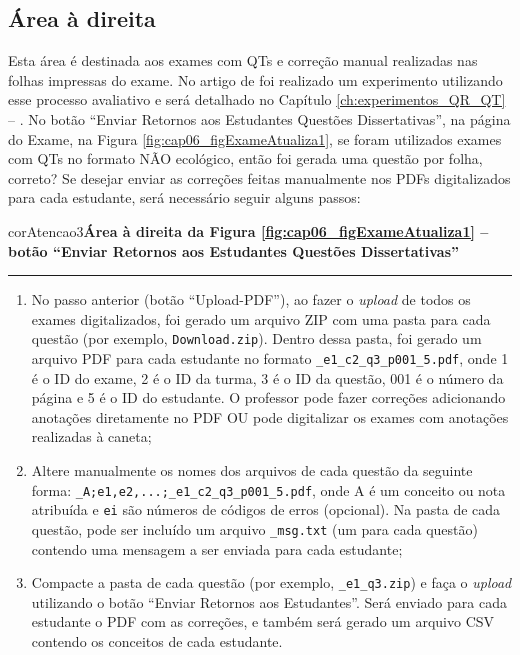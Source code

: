 \subsection{Área à direita}\label{sec:areaDireita}

Esta área é destinada aos exames com QTs e correção manual realizadas nas folhas impressas do exame. No artigo de  foi realizado um experimento utilizando esse processo avaliativo e será detalhado no Capítulo \ref{ch:experimentos_QR_QT} -- . No botão ``Enviar Retornos aos Estudantes Questões Dissertativas'', na página do Exame, na Figura \ref{fig:cap06_figExameAtualiza1}, se foram utilizados exames com QTs no formato NÃO ecológico, então foi gerada uma questão por folha, correto? Se desejar enviar as correções feitas manualmente nos PDFs digitalizados para cada estudante, será necessário seguir alguns passos:

\begin{mybox}{corAtencao3}{\textbf{Área à direita da Figura \ref{fig:cap06_figExameAtualiza1} -- botão ``Enviar Retornos aos Estudantes Questões Dissertativas''}}\\\vspace{-3mm}\hrule\vspace{1mm}
\begin{enumerate}[itemsep=-1mm]
    \item No passo anterior (botão ``Upload-PDF''), ao fazer o \textit{upload} de todos os exames digitalizados, foi gerado um arquivo ZIP com uma pasta para cada questão (por exemplo, \verb|Download.zip|). Dentro dessa pasta, foi gerado um arquivo PDF para cada estudante no formato \verb|_e1_c2_q3_p001_5.pdf|, onde 1 é o ID do exame, 2 é o ID da turma, 3 é o ID da questão, 001 é o número da página e 5 é o ID do estudante. O professor pode fazer correções adicionando anotações diretamente no PDF OU pode digitalizar os exames com anotações realizadas à caneta;
    \item Altere manualmente os nomes dos arquivos de cada questão da seguinte forma: \verb|_A;e1,e2,...;_e1_c2_q3_p001_5.pdf|, onde A é um conceito ou nota atribuída e \verb|ei| são números de códigos de erros (opcional). Na pasta de cada questão, pode ser incluído um arquivo \verb|_msg.txt| (um para cada questão) contendo uma mensagem a ser enviada para cada estudante;
    \item Compacte a pasta de cada questão (por exemplo, \verb|_e1_q3.zip|) e faça o \textit{upload} utilizando o botão ``Enviar Retornos aos Estudantes''. Será enviado para cada estudante o PDF com as correções, e também será gerado um arquivo CSV contendo os conceitos de cada estudante.
\end{enumerate}
\end{mybox}


